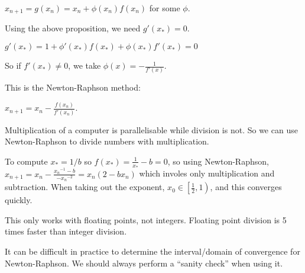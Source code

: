 $x_{n + 1} = g(x_n) = x_n + \phi (x_n) f(x_n)$ for some $\phi$.

Using the above proposition, we need $g'(x_*) = 0$.

$g'(x_*) = 1 + \phi'(x_*)f(x_*) + \phi(x_*)f'(x_*) = 0$

So if $f'(x_*) \ne 0$, we take $\phi(x) = -\frac{1}{f'(x)}$.

This is the Newton-Raphson method:

$x_{n + 1} = x_n - \frac{f(x_n)}{f'(x_n)}$.

Multiplication of a computer is parallelisable while division is not. So we can use Newton-Raphson to divide numbers with multiplication.

To compute $x_* = 1 / b$ so $f(x_*) = \frac{1}{x_*} - b = 0$, so using Newton-Raphson, $x_{n + 1} = x_n - \frac{{x_n}^{-1} - b}{-{x_n}^{-2}} = x_n (2 - b x_n)$ which involes only multiplication and subtraction. When taking out the exponent, $x_0 \in \left[ \frac{1}{2}, 1 \right)$, and this converges quickly.

\begin{remark}
	This only works with floating points, not integers. Floating point division is 5 times faster than integer division.
\end{remark}

\begin{remark}
	It can be difficult in practice to determine the interval/domain of convergence for Newton-Raphson. We should always perform a ``sanity check'' when using it.
\end{remark}

